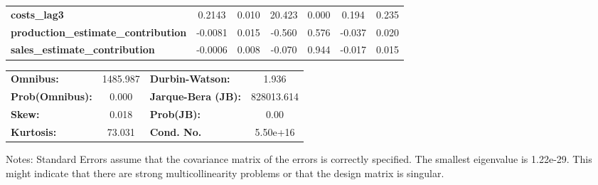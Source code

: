 \begin{center}
\begin{tabular}{lcccccc}
\textbf{costs\_lag3}                        &       0.2143  &        0.010     &    20.423  &         0.000        &        0.194    &        0.235     \\
\textbf{production\_estimate\_contribution} &      -0.0081  &        0.015     &    -0.560  &         0.576        &       -0.037    &        0.020     \\
\textbf{sales\_estimate\_contribution}      &      -0.0006  &        0.008     &    -0.070  &         0.944        &       -0.017    &        0.015     \\
\bottomrule
\end{tabular}
\begin{tabular}{lclc}
\textbf{Omnibus:}       & 1485.987 & \textbf{  Durbin-Watson:     } &     1.936   \\
\textbf{Prob(Omnibus):} &   0.000  & \textbf{  Jarque-Bera (JB):  } & 828013.614  \\
\textbf{Skew:}          &   0.018  & \textbf{  Prob(JB):          } &      0.00   \\
\textbf{Kurtosis:}      &  73.031  & \textbf{  Cond. No.          } &  5.50e+16   \\
\bottomrule
\end{tabular}
\end{center}

Notes: \newline
 [1] Standard Errors assume that the covariance matrix of the errors is correctly specified. \newline
 [2] The smallest eigenvalue is 1.22e-29. This might indicate that there are \newline
 strong multicollinearity problems or that the design matrix is singular.